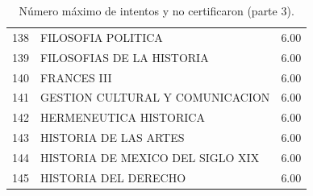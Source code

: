 \documentclass[12pt]{article}
\begin{document}
\begin{table}[ht]
{\begin{tabular}{rlr}
  138 & FILOSOFIA POLITICA & 6.00 \\ 
  139 & FILOSOFIAS DE LA HISTORIA & 6.00 \\ 
  140 & FRANCES III & 6.00 \\ 
  141 & GESTION CULTURAL Y COMUNICACION & 6.00 \\ 
  142 & HERMENEUTICA HISTORICA & 6.00 \\ 
  143 & HISTORIA DE LAS ARTES & 6.00 \\ 
  144 & HISTORIA DE MEXICO DEL SIGLO XIX & 6.00 \\ 
  145 & HISTORIA DEL DERECHO & 6.00 \\ 
   \hline
\end{tabular}
}\caption{\label{Num_Max_Intentos_Nunca_Cert_3} N\'umero m\'aximo de intentos y no certificaron (parte 3).}

\end{table}
\end{document}
